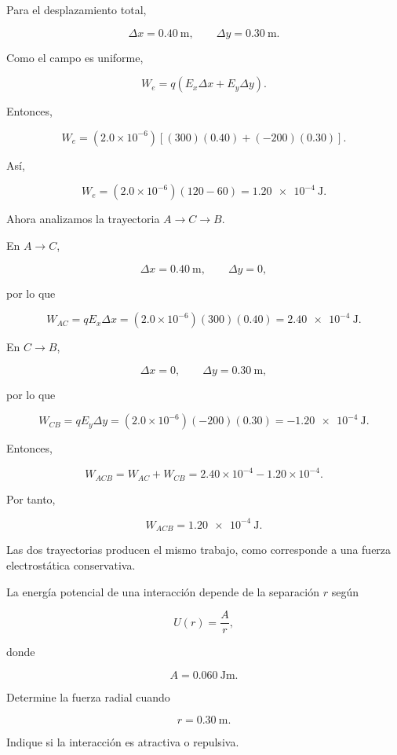 \begin{explicacion}

Para el desplazamiento total,

\[
\Delta x=\SI{0.40}{\metre},
\qquad
\Delta y=\SI{0.30}{\metre}.
\]

Como el campo es uniforme,

\[
W_e=q(E_x\Delta x+E_y\Delta y).
\]

Entonces,

\[
W_e
=
(2.0\times10^{-6})
\left[
(300)(0.40)+(-200)(0.30)
\right].
\]

Así,

\[
W_e
=
(2.0\times10^{-6})(120-60)
=
\SI{1.20e-4}{\joule}.
\]

Ahora analizamos la trayectoria \(A\to C\to B\).

En \(A\to C\),

\[
\Delta x=\SI{0.40}{\metre},
\qquad
\Delta y=0,
\]

por lo que

\[
W_{AC}
=
qE_x\Delta x
=
(2.0\times10^{-6})(300)(0.40)
=
\SI{2.40e-4}{\joule}.
\]

En \(C\to B\),

\[
\Delta x=0,
\qquad
\Delta y=\SI{0.30}{\metre},
\]

por lo que

\[
W_{CB}
=
qE_y\Delta y
=
(2.0\times10^{-6})(-200)(0.30)
=
-\SI{1.20e-4}{\joule}.
\]

Entonces,

\[
W_{ACB}
=
W_{AC}+W_{CB}
=
2.40\times10^{-4}
-
1.20\times10^{-4}.
\]

Por tanto,

\[
\boxed{W_{ACB}=\SI{1.20e-4}{\joule}}.
\]

Las dos trayectorias producen el mismo trabajo, como corresponde a una fuerza
electrostática conservativa.

\end{explicacion}


\begin{ejercicio}

La energía potencial de una interacción depende de la separación \(r\) según

\[
U(r)=\frac{A}{r},
\]

donde

\[
A=\SI{0.060}{\joule\metre}.
\]

Determine la fuerza radial cuando

\[
r=\SI{0.30}{\metre}.
\]

Indique si la interacción es atractiva o repulsiva.

\end{ejercicio}

